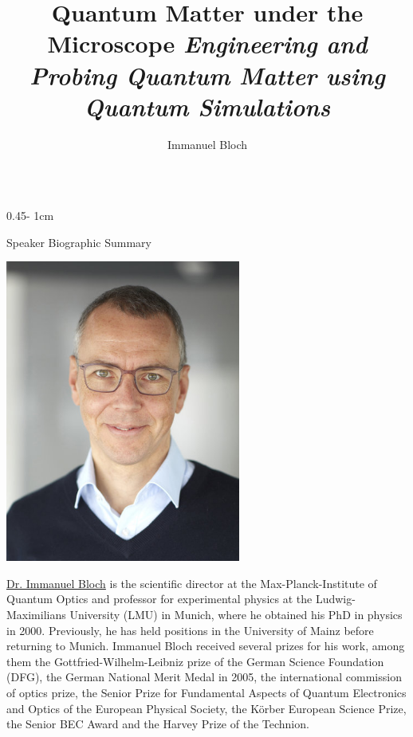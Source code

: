 \documentclass{../psuposter}
\title{Quantum Matter under the Microscope \newline
		\large{\textit{Engineering and Probing Quantum Matter using Quantum Simulations}}}
\author{Immanuel Bloch}
\institute{Ludwig Maximilians University}
\begin{document}
\begin{frame}
\begin{columns}[t, totalwidth=\textwidth]
\begin{column}{0.45\textwidth - 1cm}


    \begin{block}{Speaker Biographic Summary}
    	\begin{center}
    		\includegraphics[width=0.58\textwidth]{images/bloch}
    	\end{center}
    	\href{https://www.quantum-munich.de/104554/bloch-immanuel-prof-dr}{Dr. Immanuel Bloch} is the scientific director at the Max-Planck-Institute of Quantum Optics and professor for experimental physics at the Ludwig-Maximilians University (LMU) in Munich, where he obtained his PhD in physics in 2000. Previously, he has held positions in the University of Mainz before returning to Munich. Immanuel Bloch received several prizes for his work, among them the Gottfried-Wilhelm-Leibniz prize of the German Science Foundation (DFG), the German National Merit Medal in 2005, the international commission of optics prize, the Senior Prize for Fundamental Aspects of Quantum Electronics and Optics of the European Physical Society, the Körber European Science Prize, the Senior BEC Award and the Harvey Prize of the Technion. 
    \end{block}



\end{column}
\end{columns}
\end{frame}
\end{document}
